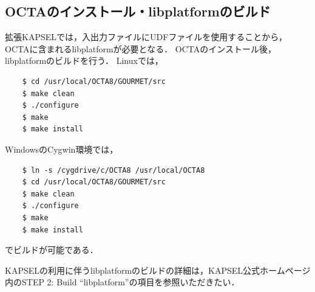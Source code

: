 \documentclass[pdflatex,a4paper,10pt,ja=standard]{bxjsarticle}
\begin{document}
\subsection{OCTAのインストール・libplatformのビルド}
拡張KAPSELでは，入出力ファイルにUDFファイルを使用することから，OCTAに含まれるlibplatformが必要となる．
OCTAのインストール後，libplatformのビルドを行う．
Linuxでは，
\begin{verbatim}
    $ cd /usr/local/OCTA8/GOURMET/src
    $ make clean
    $ ./configure
    $ make
    $ make install
\end{verbatim}
WindowsのCygwin\autocite{cygwin}環境では，
\begin{verbatim}
    $ ln -s /cygdrive/c/OCTA8 /usr/local/OCTA8
    $ cd /usr/local/OCTA8/GOURMET/src
    $ make clean
    $ ./configure
    $ make
    $ make install
\end{verbatim}

でビルドが可能である．

KAPSELの利用に伴うlibplatformのビルドの詳細は，KAPSEL公式ホームページ内のSTEP 2: Build ``libplatform''の項目\autocite{kapsel_install}を参照いただきたい．
\end{document}
